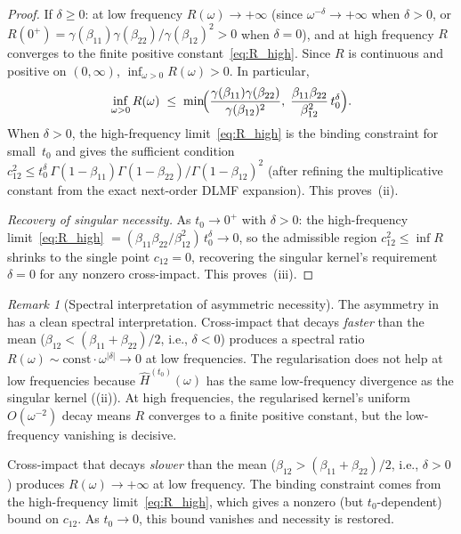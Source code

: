 \documentclass[12pt]{article}
\theoremstyle{definition}
\theoremstyle{remark}
\newtheorem{remark}[theorem]{Remark}
\begin{document}
\begin{proof}
If $\delta \ge 0$: at low frequency $R(\omega)\to +\infty$ (since
$\omega^{-\delta}\to+\infty$ when $\delta>0$, or
$R(0^+)=\gamma(\beta_{11})\gamma(\beta_{22})/\gamma(\beta_{12})^2>0$
when $\delta=0$), and at high frequency $R$ converges to the finite
positive constant~\eqref{eq:R_high}.
Since $R$ is continuous and positive on $(0,\infty)$,
$\inf_{\omega>0}R(\omega)>0$.  In particular,
\begin{equation}\label{eq:reg_infR}
  \inf_{\omega>0}R(\omega)
  \;\le\;
  \min\!\Bigl(
    \frac{\gamma(\beta_{11})\gamma(\beta_{22})}{\gamma(\beta_{12})^2},\;
    \frac{\beta_{11}\beta_{22}}{\beta_{12}^2}\,t_0^{\delta}
  \Bigr).
\end{equation}
When $\delta > 0$, the high-frequency limit~\eqref{eq:R_high} is the binding
constraint for small~$t_0$ and gives the sufficient condition
$c_{12}^2\le t_0^{\delta}\,
\Gamma(1-\beta_{11})\Gamma(1-\beta_{22})/\Gamma(1-\beta_{12})^2$
(after refining the multiplicative constant from the exact next-order
DLMF expansion).
This proves~(ii).

\medskip\noindent
\emph{Recovery of singular necessity.}
As $t_0\to 0^+$ with $\delta > 0$:
the high-frequency limit~\eqref{eq:R_high}
$= (\beta_{11}\beta_{22}/\beta_{12}^2)\,t_0^{\delta}\to 0$,
so the admissible region $c_{12}^2 \le \inf R$ shrinks to the single point
$c_{12}=0$, recovering the singular kernel's requirement $\delta = 0$
for any nonzero cross-impact.  This proves~(iii).
\end{proof}

\begin{remark}[Spectral interpretation of asymmetric necessity]\label{rem:asymmetry}
The asymmetry in  has a clean spectral interpretation.
Cross-impact that decays \emph{faster} than the mean
($\beta_{12} < (\beta_{11}+\beta_{22})/2$, i.e., $\delta<0$) produces a spectral
ratio $R(\omega)\sim\text{const}\cdot\omega^{|\delta|}\to 0$ at low frequencies.
The regularisation does not help at low frequencies because
$\widehat{H}^{(t_0)}(\omega)$ has the same low-frequency divergence as the
singular kernel ((ii)).  At high frequencies, the regularised
kernel's uniform $O(\omega^{-2})$ decay means $R$ converges to a finite positive
constant, but the low-frequency vanishing is decisive.

Cross-impact that decays \emph{slower} than the mean
($\beta_{12} > (\beta_{11}+\beta_{22})/2$, i.e., $\delta>0$) produces
$R(\omega)\to+\infty$ at low frequency.  The binding constraint comes from the
high-frequency limit~\eqref{eq:R_high}, which gives a nonzero
(but $t_0$-dependent) bound on $c_{12}$.
As $t_0\to 0$, this bound vanishes and necessity is restored.
\end{remark}
\end{document}
